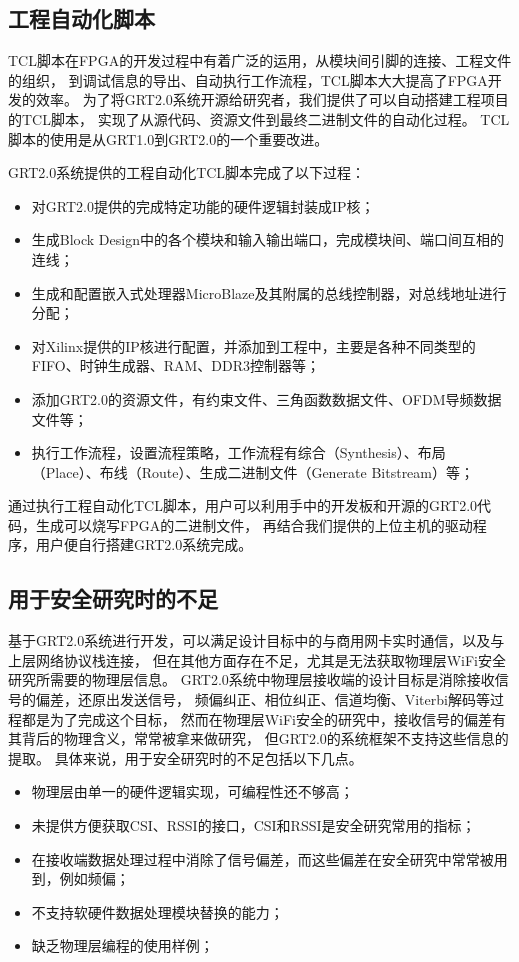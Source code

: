 		\subsection{工程自动化脚本}\label{subsec:grt2.0_script}
		TCL脚本在FPGA的开发过程中有着广泛的运用\cite{xilinxtcl}，从模块间引脚的连接、工程文件的组织，
		到调试信息的导出、自动执行工作流程，TCL脚本大大提高了FPGA开发的效率。
		为了将GRT2.0系统开源给研究者，我们提供了可以自动搭建工程项目的TCL脚本，
		实现了从源代码、资源文件到最终二进制文件的自动化过程。
		TCL脚本的使用是从GRT1.0到GRT2.0的一个重要改进。

		GRT2.0系统提供的工程自动化TCL脚本完成了以下过程：
			\begin{itemize}
				\item 对GRT2.0提供的完成特定功能的硬件逻辑封装成IP核\cite{xilinxip}；
				\item 生成Block Design\cite{xilinxblockdesign}中的各个模块和输入输出端口，完成模块间、端口间互相的连线；
				\item 生成和配置嵌入式处理器MicroBlaze\cite{microblaze}及其附属的总线控制器，对总线地址进行分配；
				\item 对Xilinx提供的IP核进行配置，并添加到工程中，主要是各种不同类型的FIFO、时钟生成器、RAM、DDR3控制器等；
				\item 添加GRT2.0的资源文件，有约束文件、三角函数数据文件、OFDM导频数据文件等；
				\item 执行工作流程，设置流程策略，工作流程有综合（Synthesis）、布局（Place）、布线（Route）、生成二进制文件（Generate Bitstream）等；
			\end{itemize}

		通过执行工程自动化TCL脚本，用户可以利用手中的开发板和开源的GRT2.0代码，生成可以烧写FPGA的二进制文件，
		再结合我们提供的上位主机的驱动程序，用户便自行搭建GRT2.0系统完成。

		\subsection{用于安全研究时的不足}\label{subsec:grt2.0_drawback}
		基于GRT2.0系统进行开发，可以满足设计目标中的与商用网卡实时通信，以及与上层网络协议栈连接，
		但在其他方面存在不足，尤其是无法获取物理层WiFi安全研究所需要的物理层信息。
		GRT2.0系统中物理层接收端的设计目标是消除接收信号的偏差，还原出发送信号，
		频偏纠正、相位纠正、信道均衡、Viterbi解码等过程都是为了完成这个目标，
		然而在物理层WiFi安全的研究中，接收信号的偏差有其背后的物理含义，常常被拿来做研究，
		但GRT2.0的系统框架不支持这些信息的提取。
		具体来说，用于安全研究时的不足包括以下几点。
			\begin{itemize}
				\item 物理层由单一的硬件逻辑实现，可编程性还不够高；
				\item 未提供方便获取CSI、RSSI的接口，CSI和RSSI是安全研究常用的指标；
				\item 在接收端数据处理过程中消除了信号偏差，而这些偏差在安全研究中常常被用到，例如频偏；
				\item 不支持软硬件数据处理模块替换的能力；
				\item 缺乏物理层编程的使用样例；
			\end{itemize}


